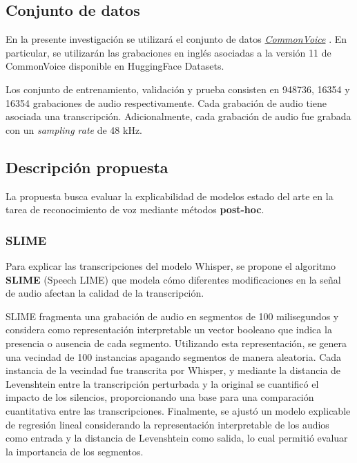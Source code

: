 \documentclass[conference]{IEEEtran}
\begin{document}
\subsection{Conjunto de datos}

En la presente investigación se utilizará el conjunto de datos \href{https://commonvoice.mozilla.org/en/datasets}{\textit{CommonVoice}} \cite{commonvoice:2020}. En particular, se utilizarán las grabaciones en inglés asociadas a la versión 11 de CommonVoice disponible en HuggingFace Datasets.

Los conjunto de entrenamiento, validación y prueba consisten en 948736, 16354 y 16354 grabaciones de audio respectivamente. Cada grabación de audio tiene asociada una transcripción. Adicionalmente, cada grabación de audio fue grabada con un \textit{sampling rate} de 48 kHz.

\subsection{Descripción propuesta}

La propuesta busca evaluar la explicabilidad de modelos estado del arte en la tarea de reconocimiento de voz mediante métodos \textbf{post-hoc}.

\subsubsection{SLIME}

Para explicar las transcripciones del modelo Whisper, se propone el algoritmo \textbf{SLIME} (Speech LIME) que modela cómo diferentes modificaciones en la señal de audio afectan la calidad de la transcripción.

SLIME fragmenta una grabación de audio en segmentos de 100 milisegundos y considera como representación interpretable un vector booleano que indica la presencia o ausencia de cada segmento. Utilizando esta representación, se genera una vecindad de 100 instancias apagando segmentos de manera aleatoria. Cada instancia de la vecindad fue transcrita por Whisper, y mediante la distancia de Levenshtein entre la transcripción perturbada y la original se cuantificó el impacto de los silencios, proporcionando una base para una comparación cuantitativa entre las transcripciones. Finalmente, se ajustó un modelo explicable de regresión lineal considerando la representación interpretable de los audios como entrada y la distancia de Levenshtein como salida, lo cual permitió evaluar la importancia de los segmentos.
\end{document}
